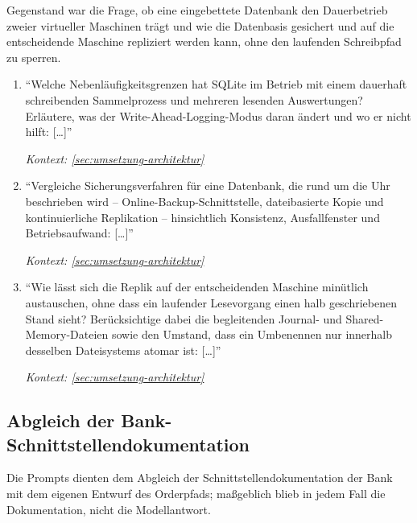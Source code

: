 Gegenstand war die Frage, ob eine eingebettete Datenbank den Dauerbetrieb
zweier virtueller Maschinen trägt und wie die Datenbasis gesichert und auf die
entscheidende Maschine repliziert werden kann, ohne den laufenden Schreibpfad
zu sperren.

\begin{enumerate}
    \item \enquote{Welche Nebenläufigkeitsgrenzen hat SQLite im Betrieb mit
            einem dauerhaft schreibenden Sammelprozess und mehreren lesenden
            Auswertungen? Erläutere, was der Write-Ahead-Logging-Modus daran
            ändert und wo er nicht hilft: [\dots]}
            \par\hfill\textit{Kontext: \cref{sec:umsetzung-architektur}}

    \item \enquote{Vergleiche Sicherungsverfahren für eine Datenbank, die
            rund um die Uhr beschrieben wird -- Online-Backup-Schnittstelle,
            dateibasierte Kopie und kontinuierliche Replikation -- hinsichtlich
            Konsistenz, Ausfallfenster und Betriebsaufwand: [\dots]}
            \par\hfill\textit{Kontext: \cref{sec:umsetzung-architektur}}

    \item \enquote{Wie lässt sich die Replik auf der entscheidenden Maschine
            minütlich austauschen, ohne dass ein laufender Lesevorgang einen
            halb geschriebenen Stand sieht? Berücksichtige dabei die
            begleitenden Journal- und Shared-Memory-Dateien sowie den
            Umstand, dass ein Umbenennen nur innerhalb desselben Dateisystems
            atomar ist: [\dots]}
            \par\hfill\textit{Kontext: \cref{sec:umsetzung-architektur}}
\end{enumerate}

\subsection{Abgleich der Bank-Schnittstellendokumentation}
\label{sec:prompts-claude-bankapi}

Die Prompts dienten dem Abgleich der Schnittstellendokumentation der Bank mit
dem eigenen Entwurf des Orderpfads; maßgeblich blieb in jedem Fall die
Dokumentation, nicht die Modellantwort.

